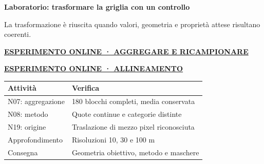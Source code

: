 \documentclass[12pt,aspectratio=1610]{beamer}
\newcommand{\PLab}[2]{\par{\color{Classical}\bfseries\fontsize{9}{11}\selectfont
\href{#1}{\MakeUppercase{#2}}}\par\vspace{1.8mm}}
\begin{document}
\begin{frame}[plain]\hypertarget{slide48}{}
\begin{lrbox}{\TitleBox}
\begin{minipage}[t]{17.7cm}\raggedright\color{Ink}\fontsize{11.3}{14.8}\selectfont
\color{Navy}\bfseries\fontsize{20.6}{24.5}\selectfont Laboratorio: trasformare la griglia con un controllo
\end{minipage}\end{lrbox}

\begin{lrbox}{\RecallBox}
\begin{minipage}[t]{14.3cm}\raggedright\color{Ink}\fontsize{11.3}{14.8}\selectfont
\fontsize{10.3}{13.8}\selectfont La trasformazione è riuscita quando valori, geometria e proprietà attese risultano coerenti.
\end{minipage}\end{lrbox}

\begin{lrbox}{\PilotLeftBox}
\begin{minipage}[t]{10.05cm}\raggedright\color{Ink}\fontsize{11.3}{14.8}\selectfont
\PLab{https://marzione00.github.io/Lab_Geo/\#laboratorio/m12-ricampionamento}{Esperimento online · aggregare e ricampionare}
\PLab{https://marzione00.github.io/Lab_Geo/\#laboratorio/m12-allineamento}{Esperimento online · allineamento}
{\fontsize{10.2}{13.1}\selectfont\renewcommand{\arraystretch}{1.45}\begin{tabular}{@{}p{4.2cm}p{4.8cm}@{}}\toprule
\textbf{Attività} & \textbf{Verifica}\\\midrule
N07: aggregazione & 180 blocchi completi, media conservata\\
N08: metodo & Quote continue e categorie distinte\\
N19: origine & Traslazione di mezzo pixel riconosciuta\\
Approfondimento & Risoluzioni 10, 30 e 100 m\\
Consegna & Geometria obiettivo, metodo e maschere\\
\bottomrule\end{tabular}}

\end{minipage}\end{lrbox}


\end{frame}
\end{document}
